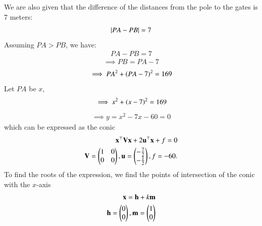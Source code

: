 \documentclass[journal]{IEEEtran}
\begin{document}
We are also given that the difference of the distances from the pole to the gates is 7 meters:
\begin{align}
\left\vert PA - PB\right\vert = 7    
\end{align} 
Assuming $PA > PB$, we have:
\begin{align}
PA - PB = 7
\end{align}
\begin{align}
\implies PB = PA - 7
\end{align}
\begin{align}
\implies PA^2 + \left(PA - 7\right)^2 = 169
\end{align}
Let $PA$ be $x$,
\begin{align}
\implies x^2 + \left(x - 7\right)^2 = 169
\end{align}
\begin{align}
\implies    y = x^2 - 7x - 60 = 0
\end{align}
which 
 can be expressed as the conic
\begin{align}
    \mathbf{x}^\top\mathbf{V}\mathbf{x} + 2\mathbf{u}^\top\mathbf{x} + f = 0 \\
    \mathbf{V} = \begin{pmatrix}1 & 0 \\ 0 & 0\end{pmatrix}, \mathbf{u} = \begin{pmatrix}-\frac{7}{2} \\ -\frac{1}{2}\end{pmatrix}, f = -60.
\end{align}
To find the roots of the expression, we find the points of intersection of the conic with the $x$-axis 
\begin{align}
    \mathbf{x} = \mathbf{h} + k\mathbf{m} \\
    \mathbf{h} = \begin{pmatrix}0 \\ 0\end{pmatrix}, \mathbf{m} = \begin{pmatrix}1 \\ 0\end{pmatrix}
\end{align}\\
\bigskip 
\end{document}
